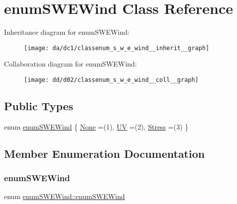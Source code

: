 \hypertarget{classenum_s_w_e_wind}{}\section{enum\+S\+W\+E\+Wind Class Reference}
\label{classenum_s_w_e_wind}


Inheritance diagram for enum\+S\+W\+E\+Wind\+:
\nopagebreak
\begin{figure}[H]
\begin{center}
\leavevmode
\texttt{[image: da/dc1/classenum\_s\_w\_e\_wind\_\_inherit\_\_graph]}
\end{center}
\end{figure}


Collaboration diagram for enum\+S\+W\+E\+Wind\+:
\nopagebreak
\begin{figure}[H]
\begin{center}
\leavevmode
\texttt{[image: dd/d02/classenum\_s\_w\_e\_wind\_\_coll\_\_graph]}
\end{center}
\end{figure}
\subsection*{Public Types}
\begin{DoxyCompactItemize}
\item 
enum \hyperlink{classenum_s_w_e_wind_a4dd2c59a8367ba98259c4ad91e72b376}{enum\+S\+W\+E\+Wind} \{ \hyperlink{classenum_s_w_e_wind_a4dd2c59a8367ba98259c4ad91e72b376a22e080303f187ae26d40468d5ffeccb7}{None} =(1), 
\hyperlink{classenum_s_w_e_wind_a4dd2c59a8367ba98259c4ad91e72b376a853cf0ae581a0009d1acfa7724e59dc6}{UV} =(2), 
\hyperlink{classenum_s_w_e_wind_a4dd2c59a8367ba98259c4ad91e72b376ad4db84c805a47e137a9a3cc1b617f2fb}{Stress} =(3)
 \}
\end{DoxyCompactItemize}


\subsection{Member Enumeration Documentation}
\mbox{\label{classenum_s_w_e_wind_a4dd2c59a8367ba98259c4ad91e72b376}} 
\subsubsection{\texorpdfstring{enum\+S\+W\+E\+Wind}{enumSWEWind}}
{\footnotesize\ttfamily enum \hyperlink{classenum_s_w_e_wind_a4dd2c59a8367ba98259c4ad91e72b376}{enum\+S\+W\+E\+Wind\+::enum\+S\+W\+E\+Wind}}

